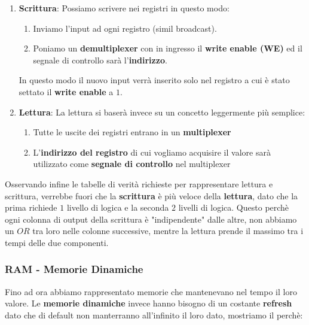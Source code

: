 \documentclass{article}
\begin{document}
\begin{enumerate}
    \item \textbf{Scrittura}: Possiamo scrivere nei registri in questo modo:
    \begin{enumerate}
        \item Inviamo l'input ad ogni registro (simil broadcast).
        \item Poniamo un \textbf{demultiplexer} con in ingresso il \textbf{write enable (WE)} ed il segnale di controllo sarà l'\textbf{indirizzo}.
    \end{enumerate}
    In questo modo il nuovo input verrà inserito solo nel registro a cui è stato settato il \textbf{write enable} a $1$.
    \item \textbf{Lettura}: La lettura si baserà invece su un concetto leggermente più semplice:
    \begin{enumerate}
        \item Tutte le uscite dei registri entrano in un \textbf{multiplexer}
        \item L'\textbf{indirizzo del registro} di cui vogliamo acquisire il valore sarà utilizzato come \textbf{segnale di controllo} nel multiplexer
    \end{enumerate}
\end{enumerate}

Osservando infine le tabelle di verità richieste per rappresentare lettura e scrittura, verrebbe fuori che la \textbf{scrittura} è più veloce della \textbf{lettura}, dato che la prima richiede $1$ livello di logica e la seconda $2$ livelli di logica. Questo perchè ogni colonna di output della scrittura è "indipendente" dalle altre, non abbiamo un $OR$ tra loro nelle colonne successive, mentre la lettura prende il massimo tra i tempi delle due componenti.

\newpage

\subsubsection{RAM - Memorie Dinamiche} Fino ad ora abbiamo rappresentato memorie che mantenevano nel tempo il loro valore. Le \textbf{memorie dinamiche} invece hanno bisogno di un costante \textbf{refresh} dato che di default non manterranno all'infinito il loro dato, mostriamo il perchè:
\end{document}
